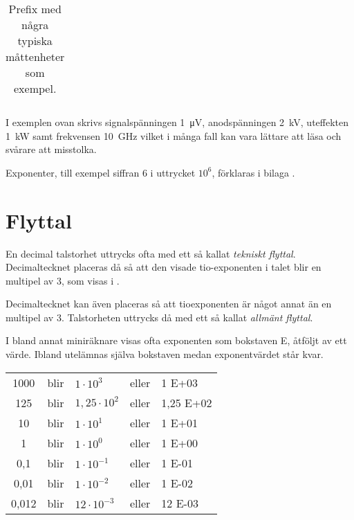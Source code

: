\begin{table*}[b]
\begin{center}
\begin{tabular}{|Sllll|}
      \hline
    \end{tabular}
  \end{center}
  \caption{Prefix med några typiska måttenheter som exempel.}
  \label{tab:prefix}
\end{table*}

I exemplen ovan skrivs signalspänningen \qty{1}{\micro\volt}, anodspänningen
\qty{2}{\kilo\volt}, uteffekten \qty{1}{\kilo\watt} samt frekvensen
\qty{10}{\giga\hertz} vilket i många fall kan vara lättare att läsa och svårare
att misstolka.

Exponenter, till exempel siffran 6 i uttrycket \(10^6\), förklaras i
bilaga .


\section{Flyttal}

En decimal talstorhet uttrycks ofta med ett så kallat \emph{tekniskt flyttal}.
Decimaltecknet placeras då så att den visade tio-exponenten i talet blir en
multipel av 3, som visas i .

Decimaltecknet kan även placeras så att tioexponenten är något annat än en
multipel av 3.
Talstorheten uttrycks då med ett så kallat \emph{allmänt flyttal}.

I bland annat miniräknare visas ofta exponenten som bokstaven E, åtföljt av ett
värde.
Ibland utelämnas själva bokstaven medan exponentvärdet står kvar.

\bigskip

\noindent\begin{tabular}{Sllll}
1000  & blir & \(1    \cdot 10^3  \) & eller & 1 E+03 \\
125   & blir & \(1,25 \cdot 10^2  \) & eller & 1,25 E+02 \\
10    & blir & \(1    \cdot 10^1  \) & eller & 1 E+01 \\
1     & blir & \(1    \cdot 10^0  \) & eller & 1 E+00 \\
0,1   & blir & \(1    \cdot 10^{-1}\) & eller & 1 E-01 \\
0,01  & blir & \(1    \cdot 10^{-2}\) & eller & 1 E-02 \\
0,012 & blir & \(12   \cdot 10^{-3}\) & eller & 12 E-03 \\
\end{tabular}

